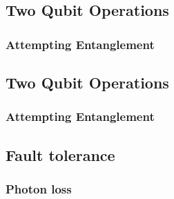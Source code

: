 
\subsection{Two Qubit Operations}
\subsubsection{Attempting Entanglement}


\subsection{Two Qubit Operations}
\subsubsection{Attempting Entanglement}


\subsection{Fault tolerance}
\subsubsection{Photon loss}